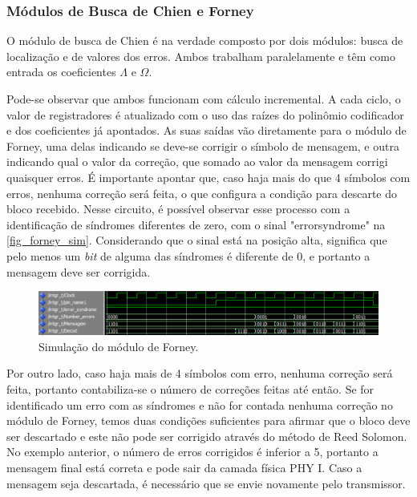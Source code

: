 	\subsubsection{Módulos de Busca de Chien e Forney}
	
	O módulo de busca de Chien é na verdade composto por dois módulos: busca de localização e de valores dos erros. Ambos trabalham paralelamente e têm como entrada os coeficientes $\Lambda$ e $\Omega$. 
	
	Pode-se observar que ambos funcionam com cálculo incremental. A cada ciclo, o valor de registradores é atualizado com o uso das raízes do polinômio codificador e dos coeficientes já apontados. As suas saídas vão diretamente para o módulo de Forney, uma delas indicando se deve-se corrigir o símbolo de mensagem, e outra indicando qual o valor da correção, que somado ao valor da mensagem corrigi quaisquer erros. É importante apontar que, caso haja mais do que 4 símbolos com erros, nenhuma correção será feita, o que configura a condição para descarte do bloco recebido. Nesse circuito, é possível observar esse processo com a identificação de síndromes diferentes de zero, com o sinal "errorsyndrome" na \autoref{fig_forney_sim}. Considerando que o sinal está na posição alta, significa que pelo menos um \textit{bit} de alguma das síndromes é diferente de 0, e portanto a mensagem deve ser corrigida. 
	
	\begin{figure}[!htb]
		\caption{\label{fig_forney_sim}Simulação do módulo de Forney.}
		\centering
		\includegraphics[width=1\textwidth]{RS/Sim_forney.PNG}
	\end{figure}
	
	Por outro lado, caso haja mais de 4 símbolos com erro, nenhuma correção será feita, portanto contabiliza-se o número de correções feitas até então. Se for identificado um erro com as síndromes e não for contada nenhuma correção no módulo de Forney, temos duas condições suficientes para afirmar que o bloco deve ser descartado e este não pode ser corrigido através do método de Reed Solomon. No exemplo anterior, o número de erros corrigidos é inferior a 5, portanto a mensagem final está correta e pode sair da camada física PHY I. Caso a mensagem seja descartada, é necessário que se envie novamente pelo transmissor.	
	
